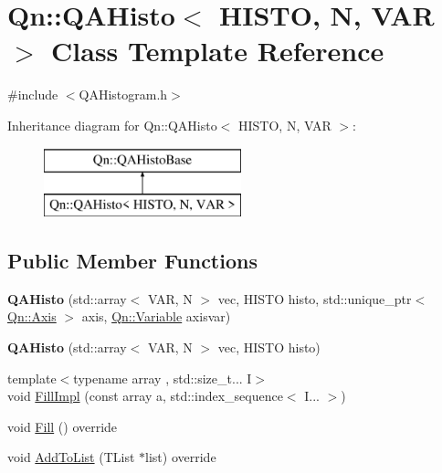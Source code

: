 \hypertarget{classQn_1_1QAHisto}{}\section{Qn\+:\+:Q\+A\+Histo$<$ H\+I\+S\+TO, N, V\+AR $>$ Class Template Reference}
\label{classQn_1_1QAHisto}


{\ttfamily \#include $<$Q\+A\+Histogram.\+h$>$}

Inheritance diagram for Qn\+:\+:Q\+A\+Histo$<$ H\+I\+S\+TO, N, V\+AR $>$\+:\begin{figure}[H]
\begin{center}
\leavevmode
\includegraphics[height=2.000000cm]{classQn_1_1QAHisto}
\end{center}
\end{figure}
\subsection*{Public Member Functions}
\begin{DoxyCompactItemize}
\item 
\mbox{\label{classQn_1_1QAHisto_a3bec5933f9d3ecc7f30d508d236ffd30}} 
{\bfseries Q\+A\+Histo} (std\+::array$<$ V\+AR, N $>$ vec, H\+I\+S\+TO histo, std\+::unique\+\_\+ptr$<$ \mbox{\hyperlink{classQn_1_1Axis}{Qn\+::\+Axis}} $>$ axis, \mbox{\hyperlink{classQn_1_1Variable}{Qn\+::\+Variable}} axisvar)
\item 
\mbox{\label{classQn_1_1QAHisto_ac6e9d11cf5550b8915419f8821616078}} 
{\bfseries Q\+A\+Histo} (std\+::array$<$ V\+AR, N $>$ vec, H\+I\+S\+TO histo)
\item 
{\footnotesize template$<$typename array , std\+::size\+\_\+t... I$>$ }\\void \mbox{\hyperlink{classQn_1_1QAHisto_a2cf01f7749c505bdbc14a0895c06d41a}{Fill\+Impl}} (const array a, std\+::index\+\_\+sequence$<$ I... $>$)
\item 
void \mbox{\hyperlink{classQn_1_1QAHisto_a0841ac824d99d03b4f2646b62bf9c93e}{Fill}} () override
\item 
void \mbox{\hyperlink{classQn_1_1QAHisto_a3d5c6dde0416609c37bfc847955e0b8d}{Add\+To\+List}} (T\+List $\ast$list) override
\end{DoxyCompactItemize}


